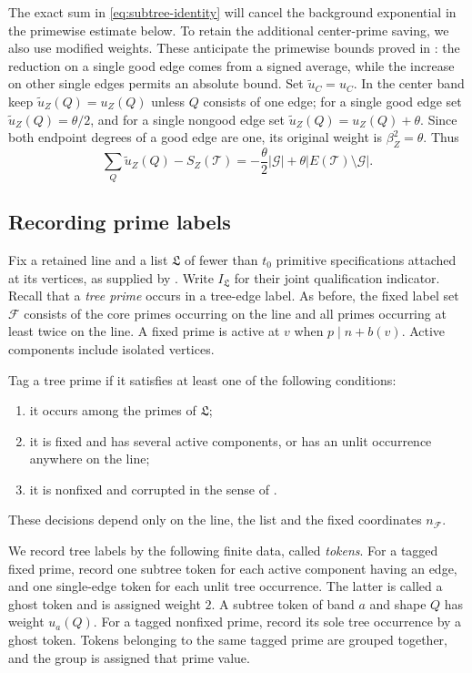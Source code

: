 The exact sum in \eqref{eq:subtree-identity} will cancel the background
exponential in the primewise estimate below.  To retain the additional
center-prime saving, we also use modified weights.  These anticipate the
primewise bounds proved in : the reduction on
a single good edge comes from a signed average, while the increase on
other single edges permits an absolute bound.
Set $\widetilde u_C=u_C$.  In the center
band keep $\widetilde u_Z(Q)=u_Z(Q)$ unless $Q$ consists of one edge;
for a single good edge set $\widetilde u_Z(Q)=\theta/2$, and for a single
nongood edge set $\widetilde u_Z(Q)=u_Z(Q)+\theta$.  Since both endpoint
degrees of a good edge are one, its original weight is
$\beta_Z^2=\theta$.  Thus
\begin{equation}\label{eq:modified-subtree-sum}
 \sum_Q\widetilde u_Z(Q)-S_Z(\mathscr T)
 =-\frac\theta2|\mathcal G|
       +\theta|E(\mathscr T)\setminus\mathcal G|.
\end{equation}

\subsection{Recording prime labels}

Fix a retained line and a list $\mathfrak L$ of fewer than $t_0$
primitive specifications attached at its vertices, as supplied by
.  Write $I_{\mathfrak L}$ for their joint
qualification indicator.  Recall that a \emph{tree prime} occurs in
a tree-edge label.  As before, the fixed label set $\mathcal F$ consists
of the core primes occurring on the line and all primes occurring at
least twice on the line.  A fixed prime is active at $v$ when
$p\mid n+b(v)$.  Active components include isolated vertices.

Tag a tree prime if it satisfies at least one of the following conditions:
\begin{enumerate}[label=(\roman*),nosep]
 \item it occurs among the primes of $\mathfrak L$;
 \item it is fixed and has several active components, or has an unlit
 occurrence anywhere on the line;
 \item it is nonfixed and corrupted in the sense of
 .
\end{enumerate}
These decisions depend only on the line, the list and the fixed
coordinates $n_{\mathcal F}$.

We record tree labels by the following finite data, called \emph{tokens}.
For a tagged fixed prime, record one subtree token for each active
component having an edge, and one single-edge token for each unlit tree
occurrence.  The latter is called a ghost token and is assigned weight
$2$.  A subtree token of band $a$ and shape $Q$ has weight $u_a(Q)$.
For a tagged nonfixed prime, record its sole tree occurrence by a ghost
token.  Tokens belonging to the same tagged prime are grouped together,
and the group is assigned that prime value.

